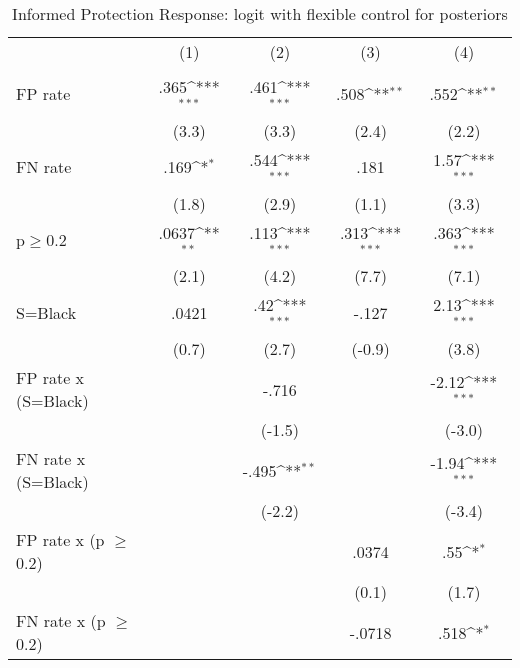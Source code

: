 \begin{table}[htbp]\centering
\def\sym#1{\ifmmode^{#1}\else\(^{#1}\)\fi}
\caption{Informed Protection Response: logit with flexible control for posteriors}
\begin{tabular}{l*{4}{c}}
\hline\hline
                &\multicolumn{1}{c}{(1)}&\multicolumn{1}{c}{(2)}&\multicolumn{1}{c}{(3)}&\multicolumn{1}{c}{(4)}\\
                &\multicolumn{1}{c}{}&\multicolumn{1}{c}{}&\multicolumn{1}{c}{}&\multicolumn{1}{c}{}\\
\hline
FP rate         &     .365\sym{***}&     .461\sym{***}&     .508\sym{**} &     .552\sym{**} \\
                &    (3.3)         &    (3.3)         &    (2.4)         &    (2.2)         \\
FN rate         &     .169\sym{*}  &     .544\sym{***}&     .181         &     1.57\sym{***}\\
                &    (1.8)         &    (2.9)         &    (1.1)         &    (3.3)         \\
p$\geq$0.2      &    .0637\sym{**} &     .113\sym{***}&     .313\sym{***}&     .363\sym{***}\\
                &    (2.1)         &    (4.2)         &    (7.7)         &    (7.1)         \\
S=Black         &    .0421         &      .42\sym{***}&    -.127         &     2.13\sym{***}\\
                &    (0.7)         &    (2.7)         &   (-0.9)         &    (3.8)         \\
FP rate x (S=Black)&                  &    -.716         &                  &    -2.12\sym{***}\\
                &                  &   (-1.5)         &                  &   (-3.0)         \\
FN rate x (S=Black)&                  &    -.495\sym{**} &                  &    -1.94\sym{***}\\
                &                  &   (-2.2)         &                  &   (-3.4)         \\
FP rate x (p $\geq$ 0.2)&                  &                  &    .0374         &      .55\sym{*}  \\
                &                  &                  &    (0.1)         &    (1.7)         \\
FN rate x (p $\geq$ 0.2)&                  &                  &   -.0718         &     .518\sym{*}  \\

\end{tabular}
\end{table}
